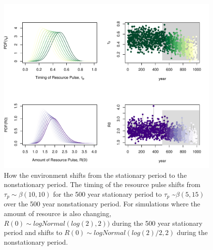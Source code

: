 \documentclass[11pt,letterpaper]{article}
\begin{document}
\begin{figure}[t!]
\centering
\includegraphics[width=1\textwidth]{..//..//R/graphs/modelruns/manuscript/modelsupp4panel.pdf}
\caption{How the environment shifts from the stationary period to the nonstationary period. The timing of the resource pulse shifts from $\tau_{p} \sim \beta(10,10)$ for the 500 year stationary period to $\tau_{p}$ \sim $\beta(5,15)$ over the 500 year nonstationary period.  For simulations where the amount of resource is also changing, $R(0)\sim logNormal(log(2), 2))$ during the 500 year stationary period and shifts to $R(0) \sim logNormal(log(2)/2,2)$ during the nonstationary period.}
\label{fig:fig_Rt_tauPt}
\end{figure}
\end{document}
